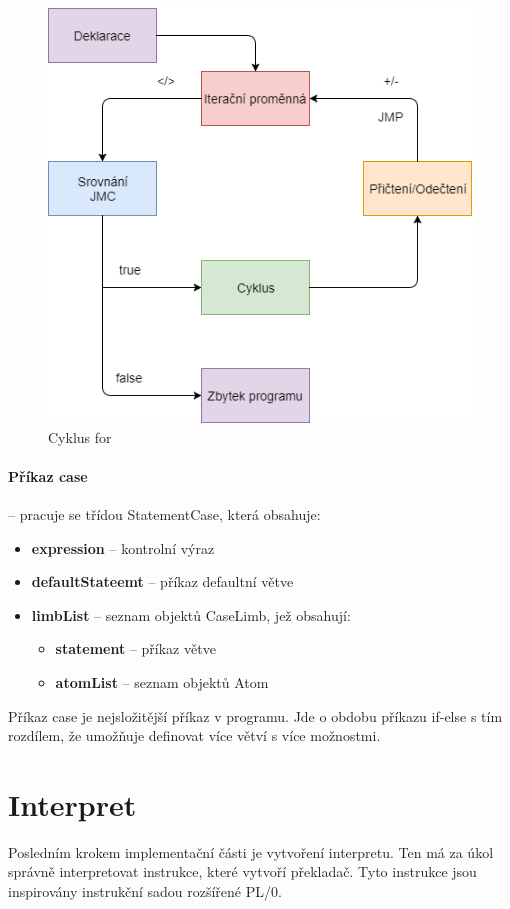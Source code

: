 \documentclass[
12pt,
a4paper,
pdftex,
czech,
titlepage
]{report}
\begin{document}
\begin{figure}[H]
\caption{Cyklus for}
\label{for}
\includegraphics[width=\textwidth]{for.png}
\end{figure}

\paragraph{Příkaz case} -- pracuje se třídou StatementCase, která obsahuje:
\begin{itemize}
\item \textbf{expression} -- kontrolní výraz
\item \textbf{defaultStateemt} -- příkaz defaultní větve
\item \textbf{limbList} -- seznam objektů CaseLimb, jež obsahují:
\begin{itemize}
\item \textbf{statement} -- příkaz větve
\item \textbf{atomList} -- seznam objektů Atom
\end{itemize}
\end{itemize}

Příkaz case je nejsložitější příkaz v programu. Jde o obdobu příkazu if-else s tím rozdílem, že umožňuje definovat více větví s více možnostmi.
 
\section{Interpret}
Posledním krokem implementační části je vytvoření interpretu. Ten má za úkol správně interpretovat instrukce, které vytvoří překladač. Tyto instrukce jsou inspirovány instrukční sadou rozšířené PL/0. 
\end{document}
